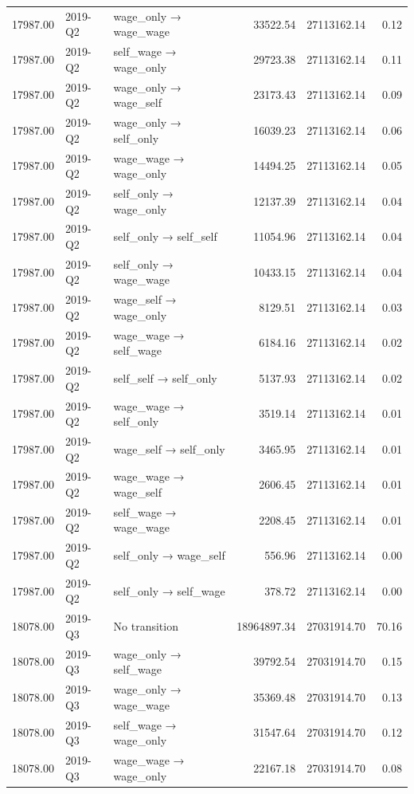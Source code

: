 \begin{table}[ht]
{\begin{tabular}{rllrrr}
  17987.00 & 2019-Q2 & wage\_only → wage\_wage & 33522.54 & 27113162.14 & 0.12 \\ 
  17987.00 & 2019-Q2 & self\_wage → wage\_only & 29723.38 & 27113162.14 & 0.11 \\ 
  17987.00 & 2019-Q2 & wage\_only → wage\_self & 23173.43 & 27113162.14 & 0.09 \\ 
  17987.00 & 2019-Q2 & wage\_only → self\_only & 16039.23 & 27113162.14 & 0.06 \\ 
  17987.00 & 2019-Q2 & wage\_wage → wage\_only & 14494.25 & 27113162.14 & 0.05 \\ 
  17987.00 & 2019-Q2 & self\_only → wage\_only & 12137.39 & 27113162.14 & 0.04 \\ 
  17987.00 & 2019-Q2 & self\_only → self\_self & 11054.96 & 27113162.14 & 0.04 \\ 
  17987.00 & 2019-Q2 & self\_only → wage\_wage & 10433.15 & 27113162.14 & 0.04 \\ 
  17987.00 & 2019-Q2 & wage\_self → wage\_only & 8129.51 & 27113162.14 & 0.03 \\ 
  17987.00 & 2019-Q2 & wage\_wage → self\_wage & 6184.16 & 27113162.14 & 0.02 \\ 
  17987.00 & 2019-Q2 & self\_self → self\_only & 5137.93 & 27113162.14 & 0.02 \\ 
  17987.00 & 2019-Q2 & wage\_wage → self\_only & 3519.14 & 27113162.14 & 0.01 \\ 
  17987.00 & 2019-Q2 & wage\_self → self\_only & 3465.95 & 27113162.14 & 0.01 \\ 
  17987.00 & 2019-Q2 & wage\_wage → wage\_self & 2606.45 & 27113162.14 & 0.01 \\ 
  17987.00 & 2019-Q2 & self\_wage → wage\_wage & 2208.45 & 27113162.14 & 0.01 \\ 
  17987.00 & 2019-Q2 & self\_only → wage\_self & 556.96 & 27113162.14 & 0.00 \\ 
  17987.00 & 2019-Q2 & self\_only → self\_wage & 378.72 & 27113162.14 & 0.00 \\ 
  18078.00 & 2019-Q3 & No transition & 18964897.34 & 27031914.70 & 70.16 \\ 
  18078.00 & 2019-Q3 & wage\_only → self\_wage & 39792.54 & 27031914.70 & 0.15 \\ 
  18078.00 & 2019-Q3 & wage\_only → wage\_wage & 35369.48 & 27031914.70 & 0.13 \\ 
  18078.00 & 2019-Q3 & self\_wage → wage\_only & 31547.64 & 27031914.70 & 0.12 \\ 
  18078.00 & 2019-Q3 & wage\_wage → wage\_only & 22167.18 & 27031914.70 & 0.08 \\ 

\end{tabular}}
\end{table}
